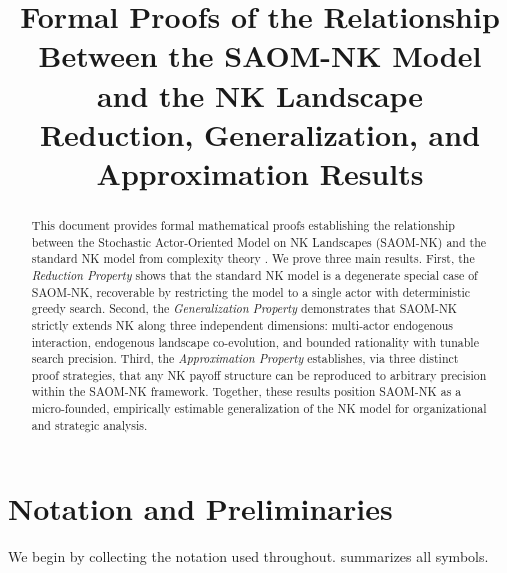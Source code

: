 \documentclass[12pt]{article}
\title{%
  \textbf{Formal Proofs of the Relationship\\
  Between the SAOM-NK Model and the NK Landscape}\\[6pt]
  \large Reduction, Generalization, and Approximation Results}
\author{}
\date{}
\begin{document}
\maketitle

\begin{abstract}
\noindent
This document provides formal mathematical proofs establishing the
relationship between the Stochastic Actor-Oriented Model on NK Landscapes
(SAOM-NK) and the standard NK model from complexity theory
\citep{kauffman1993origins, levinthal1997adaptation}. We prove three main
results. First, the \emph{Reduction Property} shows that the standard NK model is
a degenerate special case of SAOM-NK, recoverable by restricting the model to a
single actor with deterministic greedy search. Second, the
\emph{Generalization Property} demonstrates that SAOM-NK strictly extends NK along
three independent dimensions: multi-actor endogenous interaction, endogenous
landscape co-evolution, and bounded rationality with tunable search precision.
Third, the \emph{Approximation Property} establishes, via three distinct proof
strategies, that any NK payoff structure can be reproduced to arbitrary precision
within the SAOM-NK framework. Together, these results position SAOM-NK as a
micro-founded, empirically estimable generalization of the NK model for
organizational and strategic analysis.
\end{abstract}

\bigskip

\section{Notation and Preliminaries}
\label{sec:notation}

We begin by collecting the notation used throughout. 
summarizes all symbols.
\end{document}
